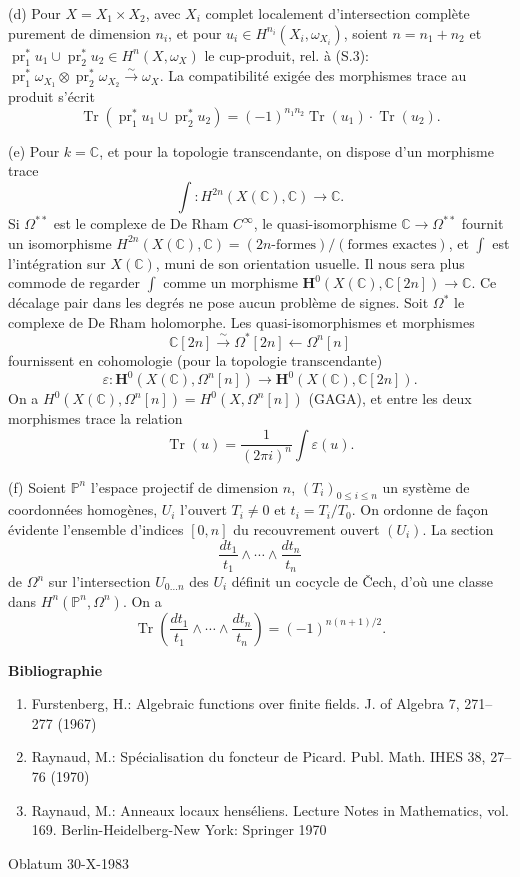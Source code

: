 \documentclass[11pt,leqno]{article}
\DeclareMathOperator{\Tr}{Tr}
\newcommand{\CC}{\mathbb C}
\newcommand{\PP}{\mathbb P}
\begin{document}
\noindent (d) Pour $X=X_1\times X_2$, avec $X_i$ complet localement d'intersection complète purement de dimension $n_i$, et pour $u_i\in H^{n_i}(X_i,\omega_{X_i})$, soient $n=n_1+n_2$ et $\operatorname{pr}_1^*u_1\cup\operatorname{pr}_2^*u_2\in H^n(X,\omega_X)$ le cup-produit, rel. à (S.3): $\operatorname{pr}_1^*\omega_{X_1}\otimes\operatorname{pr}_2^*\omega_{X_2}\xrightarrow{\sim}\omega_X$. La compatibilité exigée des morphismes trace au produit s'écrit
\[
        \Tr(\operatorname{pr}_1^*u_1\cup\operatorname{pr}_2^*u_2)
        =(-1)^{n_1n_2}\Tr(u_1)\cdot\Tr(u_2).
\]

\noindent (e) Pour $k=\CC$, et pour la topologie transcendante, on dispose d'un morphisme trace
\[
        \int:H^{2n}(X(\CC),\CC)\longrightarrow\CC.
\]
Si $\Omega^{**}$ est le complexe de De Rham $C^\infty$, le quasi-isomorphisme $\CC\to\Omega^{**}$ fournit un isomorphisme $H^{2n}(X(\CC),\CC)=(2n\text{-formes})/(\text{formes exactes})$, et $\int$ est l'intégration sur $X(\CC)$, muni de son orientation usuelle. Il nous sera plus commode de regarder $\int$ comme un morphisme $\mathbf H^0(X(\CC),\CC[2n])\to\CC$. Ce décalage pair dans les degrés ne pose aucun problème de signes. Soit $\Omega^*$ le complexe de De Rham holomorphe. Les quasi-isomorphismes et morphismes
\[
        \CC[2n]\xrightarrow{\sim}\Omega^*[2n]\longleftarrow\Omega^n[n]
\]
fournissent en cohomologie (pour la topologie transcendante)
\[
        \varepsilon:\mathbf H^0(X(\CC),\Omega^n[n])\longrightarrow \mathbf H^0(X(\CC),\CC[2n]).
\]
On a $H^0(X(\CC),\Omega^n[n])=H^0(X,\Omega^n[n])$ (GAGA), et entre les deux morphismes trace la relation
\[
        \Tr(u)=\frac{1}{(2\pi i)^n}\int \varepsilon(u).
\]

\noindent (f) Soient $\PP^n$ l'espace projectif de dimension $n$, $(T_i)_{0\le i\le n}$ un système de coordonnées homogènes, $U_i$ l'ouvert $T_i\ne0$ et $t_i=T_i/T_0$. On ordonne de façon évidente l'ensemble d'indices $[0,n]$ du recouvrement ouvert $(U_i)$. La section
\[
        \frac{dt_1}{t_1}\wedge\cdots\wedge\frac{dt_n}{t_n}
\]
de $\Omega^n$ sur l'intersection $U_{0\ldots n}$ des $U_i$ définit un cocycle de Čech, d'où une classe dans $H^n(\PP^n,\Omega^n)$. On a
\[
        \Tr\left(\frac{dt_1}{t_1}\wedge\cdots\wedge\frac{dt_n}{t_n}\right)
        =(-1)^{n(n+1)/2}.
\]

\begin{center}
{\Large\bfseries Bibliographie}
\end{center}
\begin{enumerate}[label=\arabic*.,leftmargin=2em,itemsep=0pt,topsep=0.3em]
\item Furstenberg, H.: Algebraic functions over finite fields. J. of Algebra 7, 271--277 (1967)
\item Raynaud, M.: Spécialisation du foncteur de Picard. Publ. Math. IHES 38, 27--76 (1970)
\item Raynaud, M.: Anneaux locaux henséliens. Lecture Notes in Mathematics, vol. 169. Berlin-Heidelberg-New York: Springer 1970
\end{enumerate}

\vspace{1.2em}
\begin{center}
Oblatum 30-X-1983
\end{center}
\vfill
\end{document}
